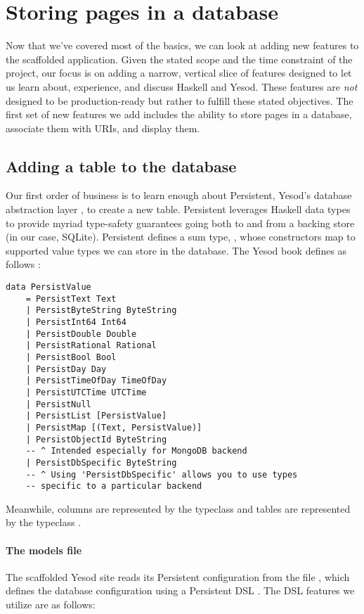 \section{Storing pages in a database}

Now that we've covered most of the basics, we can look at adding new features to the scaffolded application. Given the stated scope and the time constraint of the project, our focus is on adding a narrow, vertical slice of features designed to let us learn about, experience, and discuss Haskell and Yesod. These features are \emph{not} designed to be production-ready but rather to fulfill these stated objectives. The first set of new features we add includes the ability to store pages in a database, associate them with URIs, and display them.

\subsection{Adding a table to the database}

Our first order of business is to learn enough about Persistent, Yesod's database abstraction layer \cite{ybkPersistent}, to create a new table. Persistent leverages Haskell data types to provide myriad type-safety guarantees going both to and from a backing store (in our case, SQLite). Persistent defines a sum type, , whose constructors map to supported value types we can store in the database. The Yesod book defines  as follows \cite{ybkPersistent}:

\begin{Verbatim}
data PersistValue
    = PersistText Text
    | PersistByteString ByteString
    | PersistInt64 Int64
    | PersistDouble Double
    | PersistRational Rational
    | PersistBool Bool
    | PersistDay Day
    | PersistTimeOfDay TimeOfDay
    | PersistUTCTime UTCTime
    | PersistNull
    | PersistList [PersistValue]
    | PersistMap [(Text, PersistValue)]
    | PersistObjectId ByteString
    -- ^ Intended especially for MongoDB backend
    | PersistDbSpecific ByteString
    -- ^ Using 'PersistDbSpecific' allows you to use types
    -- specific to a particular backend
\end{Verbatim}

Meanwhile, columns are represented by the  typeclass and tables are represented by the  typeclass \cite{ybkPersistent}.

\paragraph{The models file} The scaffolded Yesod site reads its Persistent configuration from the file , which defines the database configuration using a Persistent DSL \cite{ybkScaffolding}. The DSL features we utilize are as follows:

